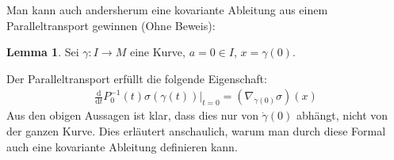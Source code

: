 \documentclass[a4paper]{scrreprt}
\numberwithin{equation}{chapter}
\newcommand{\D}{\mathrm{d}}
\theoremstyle{definition}
\newtheorem{lemma}[defn]{Lemma}
\begin{document}
		Man kann auch andersherum eine kovariante Ableitung aus einem Paralleltransport gewinnen (Ohne Beweis):
		\begin{lemma}
			Sei $\gamma\colon I\rightarrow M$ eine Kurve, $a=0\in I$, $x=\gamma(0)$.
			
			Der Paralleltransport erfüllt die folgende Eigenschaft:
			\begin{align*}
				\frac{\D}{\D t} P^{-1}_0(t) \sigma(\gamma(t))\Big\vert_{t=0}=(\nabla_{\dot{\gamma}(0)}\sigma) (x)
			\end{align*}
			Aus den obigen Aussagen ist klar, dass dies nur von $\dot{\gamma}(0)$ abhängt, nicht von der ganzen Kurve. Dies erläutert anschaulich, warum man durch diese Formal auch eine kovariante Ableitung definieren kann.
		\end{lemma}
		
\end{document}
